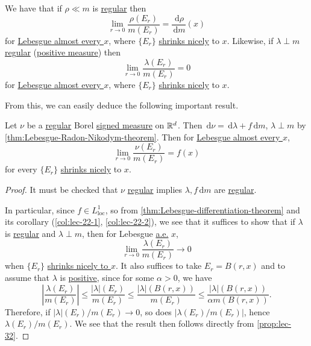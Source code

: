\begin{prev}
	We have that if \(\rho \ll m\) is \hyperref[def:regular]{regular} then
	\[
		\lim_{r \to 0} \frac{\rho(E_r)}{m(E_r)} = \frac{\,\mathrm{d}\rho}{\,\mathrm{d}m}(x)
	\]
	for \hyperref[def:mu-almost-everywhere]{Lebesgue almost every \(x\)}, where \(\{E_r\}\) \hyperref[def:shrink-nicely]{shrinks nicely} to \(x\).
	Likewise, if \(\lambda \perp m\) \hyperref[def:regular]{regular} (\hyperref[def:signed-measure]{positive measure}) then
	\[
		\lim_{r \to 0} \frac{\lambda(E_r)}{m(E_r)} = 0
	\]
	for \hyperref[def:mu-almost-everywhere]{Lebesgue almost every \(x\)}, where \(\{E_r\}\) \hyperref[def:shrink-nicely]{shrinks nicely} to \(x\).
\end{prev}

From this, we can easily deduce the following important result.
\begin{theorem}\label{thm:Lebesgue-differentiation-theorem-for-regular-measure}
	Let \(\nu\) be a \hyperref[def:regular]{regular} Borel \hyperref[def:signed-measure]{signed measure} on \(\mathbb{\MakeUppercase{r}} ^d\).
	Then \(\,\mathrm{d}\nu = \,\mathrm{d}\lambda + f \,\mathrm{d}m\), \(\lambda \perp m\) by \autoref{thm:Lebesgue-Radon-Nikodym-theorem}.
	Then for \hyperref[def:mu-almost-everywhere]{Lebesgue almost every \(x\)},
	\[
		\lim_{r \to 0} \frac{\nu(E_r)}{m(E_r)} = f(x)
	\]
	for every \(\{E_r\}\) \hyperref[def:shrink-nicely]{shrinks nicely} to \(x\).
\end{theorem}
\begin{proof}
	It must be checked that \(\nu\) \hyperref[def:regular]{regular} implies \(\lambda, f \,\mathrm{d}m\) are \hyperref[def:regular]{regular}.

	In particular, since \(f\in L^1_{\mathrm{loc} } \), so from \autoref{thm:Lebesgue-differentiation-theorem} and its corollary (\autoref{col:lec-22-1}, \autoref{col:lec-22-2}),
	we see that it suffices to show that if \(\lambda \) is \hyperref[def:regular]{regular} and \(\lambda \perp m\),
	then for Lebesgue \hyperref[def:mu-almost-everywhere]{a.e.} \(x\),
	\[
		\lim\limits_{r \to 0} \frac{\lambda (E_{r} )}{m(E_{r} )}\to 0
	\]
	when \(\{E_{r} \}\) \hyperref[def:shrink-nicely]{shrinks nicely to \(x\)}. It also suffices to take \(E_{r} = B(r, x)\) and to assume that \(\lambda \) is
	\hyperref[def:signed-measure]{positive}, since for some \(\alpha >0\), we have
	\[
		\left\vert \frac{\lambda (E_{r} )}{m(E_{r} )} \right\vert
		\leq \frac{\left\vert \lambda \right\vert(E_{r} ) }{m(E_{r} )}
		\leq \frac{\left\vert \lambda \right\vert(B(r, x)) }{m(E_{r} )}
		\leq \frac{\left\vert \lambda \right\vert(B(r, x)) }{\alpha m(B(r, x))}.
	\]
	Therefore, if \(\left\vert \lambda \right\vert(E_{r} ) / m(E_{r} ) \to 0\), so does \(\left\vert \lambda (E_{r} ) / m(E_{r} ) \right\vert \),
	hence \(\lambda (E_{r} ) / m(E_{r} )\). We see that the result then follows directly from \autoref{prop:lec-32}.
\end{proof}

